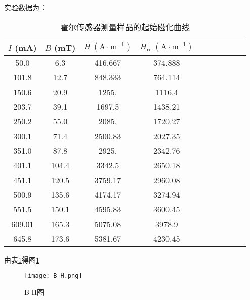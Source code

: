 \documentclass[11pt]{article}
\begin{document}
	实验数据为：
	\begin{table}[H]\centering
		\caption{霍尔传感器测量样品的起始磁化曲线}
		\label{2.1表}
		\begin{tabular}{cccccccccc}\toprule
			$I$ (mA) & $B$ (mT) & $H \ \mathrm{(A\cdot m^{-1})}$ &  $H_{\text{re}} \ \mathrm{(A\cdot m^{-1})}$   \\
			\midrule
			50.0     & 6.3     & 416.667                         & 374.888                                 \\
			101.8    & 12.7    & 848.333                         & 764.114                                 \\
			150.6    & 20.9    & 1255.                           & 1116.4                                  \\
			203.7    & 39.1    & 1697.5                          & 1438.21                                 \\
			250.2    & 55.0    & 2085.                           & 1720.27                                 \\
			300.1    & 71.4    & 2500.83                         & 2027.35                                 \\
			351.0    & 87.8    & 2925.                           & 2342.76                                 \\
			401.1    & 104.4   & 3342.5                          & 2650.18                                 \\
			451.1    & 120.5   & 3759.17                         & 2960.08                                 \\
			500.9    & 135.6   & 4174.17                         & 3274.94                                 \\
			551.5    & 150.1   & 4595.83                         & 3600.45                                 \\
			609.01   & 165.3   & 5075.08                         & 3978.9                                  \\
			645.8    & 173.6   & 5381.67                         & 4230.45                                 \\
			\bottomrule
		\end{tabular}
	\end{table}
	
	由表\ref{2.1表}得图\ref{fig:B-H}
	\begin{figure}[H]
		\centering
		\texttt{[image: B-H.png]}
		\caption{B-H图}
		\label{fig:B-H}
	\end{figure}
	
\end{document}
